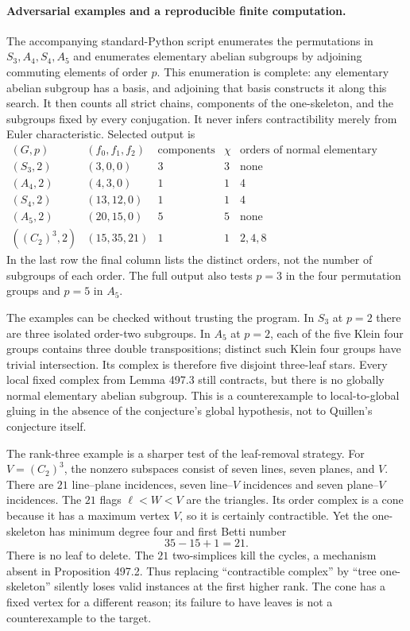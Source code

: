 \documentclass[11pt]{article}
\begin{document}
\paragraph{Adversarial examples and a reproducible finite computation.}
The accompanying standard-Python script enumerates the permutations in
$S_3,A_4,S_4,A_5$ and enumerates elementary abelian subgroups by adjoining
commuting elements of order $p$. This enumeration is complete: any
elementary abelian subgroup has a basis, and adjoining that basis constructs
it along this search. It then counts all strict chains, components of the
one-skeleton, and the subgroups fixed by every conjugation. It never infers
contractibility merely from Euler characteristic. Selected output is
\[
\begin{array}{c|c|c|c|c}
 (G,p)&(f_0,f_1,f_2)&\text{components}&\chi&
       \text{orders of normal elementary subgroups}\\ \hline
 (S_3,2)&(3,0,0)&3&3&\text{none}\\
 (A_4,2)&(4,3,0)&1&1&4\\
 (S_4,2)&(13,12,0)&1&1&4\\
 (A_5,2)&(20,15,0)&5&5&\text{none}\\
 ((C_2)^3,2)&(15,35,21)&1&1&2,4,8
\end{array}
\]
In the last row the final column lists the distinct orders, not the number
of subgroups of each order. The full output also tests $p=3$ in the four
permutation groups and $p=5$ in $A_5$.

The examples can be checked without trusting the program. In $S_3$ at
$p=2$ there are three isolated order-two subgroups. In $A_5$ at $p=2$,
each of the five Klein four groups contains three double transpositions;
distinct such Klein four groups have trivial intersection. Its complex is
therefore five disjoint three-leaf stars. Every local fixed complex from
Lemma 497.3 still contracts, but there is no globally normal elementary
abelian subgroup. This is a counterexample to local-to-global gluing in
the absence of the conjecture's global hypothesis, not to Quillen's
conjecture itself.

The rank-three example is a sharper test of the leaf-removal strategy.
For $V=(C_2)^3$, the nonzero subspaces consist of seven lines, seven
planes, and $V$. There are $21$ line--plane incidences, seven line--$V$
incidences and seven plane--$V$ incidences. The $21$ flags
$\ell<W<V$ are the triangles. Its order complex is a cone because it has
a maximum vertex $V$, so it is certainly contractible. Yet the one-skeleton
has minimum degree four and first Betti number
\[
 35-15+1=21.
\]
There is no leaf to delete. The $21$ two-simplices kill the cycles, a
mechanism absent in Proposition 497.2. Thus replacing ``contractible
complex'' by ``tree one-skeleton'' silently loses valid instances at the
first higher rank. The cone has a fixed vertex for a different reason;
its failure to have leaves is not a counterexample to the target.
\end{document}
